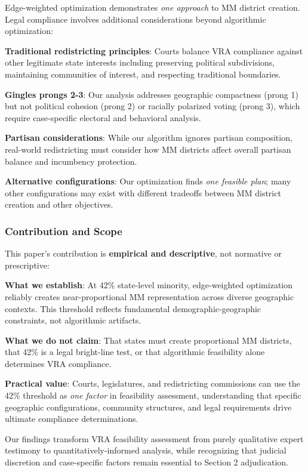 Edge-weighted optimization demonstrates \emph{one approach} to MM district creation. Legal compliance involves additional considerations beyond algorithmic optimization:

\textbf{Traditional redistricting principles}: Courts balance VRA compliance against other legitimate state interests including preserving political subdivisions, maintaining communities of interest, and respecting traditional boundaries.

\textbf{Gingles prongs 2-3}: Our analysis addresses geographic compactness (prong 1) but not political cohesion (prong 2) or racially polarized voting (prong 3), which require case-specific electoral and behavioral analysis.

\textbf{Partisan considerations}: While our algorithm ignores partisan composition, real-world redistricting must consider how MM districts affect overall partisan balance and incumbency protection.

\textbf{Alternative configurations}: Our optimization finds \emph{one feasible plan}; many other configurations may exist with different tradeoffs between MM district creation and other objectives.

\subsubsection{Contribution and Scope}

This paper's contribution is \textbf{empirical and descriptive}, not normative or prescriptive:

\textbf{What we establish}: At 42\% state-level minority, edge-weighted optimization reliably creates near-proportional MM representation across diverse geographic contexts. This threshold reflects fundamental demographic-geographic constraints, not algorithmic artifacts.

\textbf{What we do not claim}: That states must create proportional MM districts, that 42\% is a legal bright-line test, or that algorithmic feasibility alone determines VRA compliance.

\textbf{Practical value}: Courts, legislatures, and redistricting commissions can use the 42\% threshold as \emph{one factor} in feasibility assessment, understanding that specific geographic configurations, community structures, and legal requirements drive ultimate compliance determinations.

Our findings transform VRA feasibility assessment from purely qualitative expert testimony to quantitatively-informed analysis, while recognizing that judicial discretion and case-specific factors remain essential to Section 2 adjudication.
